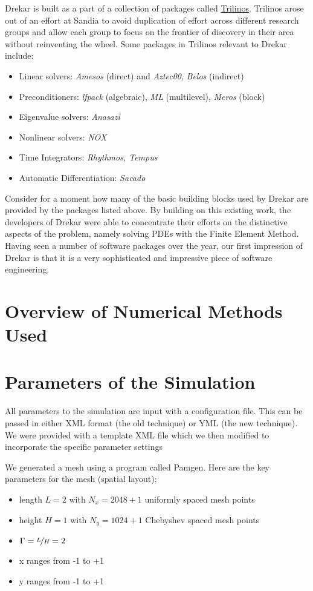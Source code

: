 \documentclass[11pt]{article} %
\begin{document}
Drekar is built as a part of a collection of packages called
\href{https://trilinos.github.io/}{Trilinos}.
Trilinos arose out of an effort at Sandia to avoid duplication of effort across
different research groups and allow each group to focus on the frontier
of discovery in their area without reinventing the wheel.
Some packages in Trilinos relevant to Drekar include:
\begin{itemize}
\item{Linear solvers}: \textit{Amesos} (direct) and \textit{Aztec00}, \textit{Belos} (indirect)
\item{Preconditioners}: \textit{lfpack} (algebraic), \textit{ML} (multilevel), \textit{Meros} (block)
\item{Eigenvalue solvers}: \textit{Anasazi}
\item{Nonlinear solvers}: \textit{NOX}
\item{Time Integrators}: \textit{Rhythmos, Tempus}
\item{Automatic Differentiation}: \textit{Sacado}
\end{itemize}
Consider for a moment how many of the basic building blocks used by Drekar
are provided by the packages listed above.
By building on this existing work, the developers of Drekar were able 
to concentrate their efforts on the distinctive aspects of the problem,
namely solving PDEs with the Finite Element Method.
Having seen a number of software packages over the year, 
our first impression of Drekar is that it is a very sophisticated 
and impressive piece of software engineering.

\section{Overview of Numerical Methods Used}

\section{Parameters of the Simulation}
All parameters to the simulation are input with a configuration file.
This can be passed in either XML format (the old technique) or YML (the new technique).
We were provided with a template XML file which we then modified to incorporate the 
specific parameter settings 

We generated a mesh using a program called Pamgen.  Here are the key parameters for the mesh (spatial layout):
\begin{itemize}
\item{length} $L=2$  with $N_x = 2048 + 1$ uniformly spaced mesh points
\item{height} $H=1$ with $N_y = 1024 + 1$ Chebyshev spaced mesh points
\item{$\Gamma = \nicefrac{L}{H} = 2$}
\item{x} ranges from -1 to +1
\item{y} ranges from -1 to +1
\end{itemize}
\end{document}
